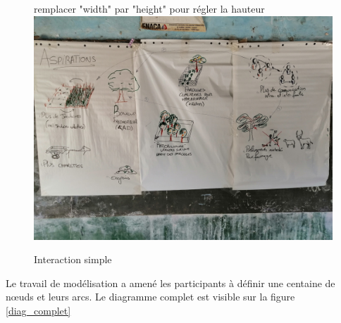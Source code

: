 \begin{figure}
\begin{center}
remplacer "width" par "height" pour régler la hauteur
\includegraphics[width=15cm]{img/aspiration_formulee.jpg}
\end{center}
\caption{Interaction simple }
\label{aspiration}
\end{figure}





Le travail de modélisation a amené les participants à définir une centaine de nœuds et leurs arcs. Le diagramme complet est visible sur la figure \ref{diag_complet} 


